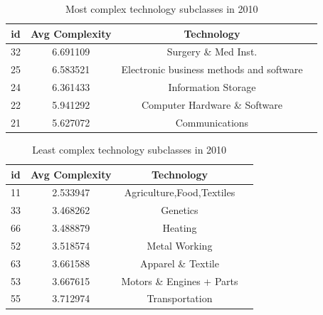 \documentclass[12pt]{article}
\begin{document}
\newpage
\begin{table}[htbp]\centering \caption{Most complex technology subclasses in 2010 \label{sumstat}}
\begin{tabular}{l c c  c}\hline\hline
\multicolumn{1}{c}{\textbf{id}} & \textbf{Avg Complexity} & \textbf{Technology} \\ \hline
32	&6.691109	&Surgery \& Med Inst.\\
25	&6.583521	&Electronic business methods and software\\
24	&6.361433	&Information Storage\\
22	&5.941292	&Computer Hardware \& Software\\
21	&5.627072	&Communications\\
\hline
\end{tabular}
\end{table}

\begin{table}[htbp]\centering \caption{Least complex technology subclasses in 2010 \label{sumstat}}
\begin{tabular}{l c c  c}\hline\hline
\multicolumn{1}{c}{\textbf{id}} & \textbf{Avg Complexity} & \textbf{Technology} \\ \hline
11	&2.533947	&Agriculture,Food,Textiles\\
33	&3.468262	&Genetics\\
66	&3.488879	&Heating\\
52	&3.518574	&Metal Working\\
63	&3.661588	&Apparel \& Textile\\
53	&3.667615	&Motors \& Engines + Parts\\
55	&3.712974	&Transportation\\
\hline
\end{tabular}
\end{table}

\newpage

\newpage

\newpage
\begin{landscape}

\end{landscape}
\newpage

\newpage

\newpage

\newpage

\newpage

\newpage

\end{document}

